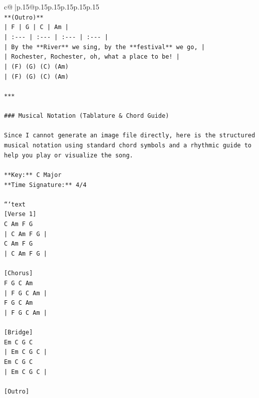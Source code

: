 \documentclass{article}
\begin{document}
{\begin{supertabular}{c@{$\;$}|p{.15\linewidth}@{}p{.15\linewidth}p{.15\linewidth}p{.15\linewidth}p{.15\linewidth}p{.15\linewidth}}
{{{\\ 
\texttt{**(Outro)**} \\
\texttt{| F | G | C | Am |} \\
\texttt{| :{-}{-}{-} | :{-}{-}{-} | :{-}{-}{-} | :{-}{-}{-} |} \\
\texttt{| By the **River** we sing, by the **festival** we go, |} \\
\texttt{| Rochester, Rochester, oh, what a place to be! |} \\
\texttt{| (F) (G) (C) (Am)} \\
\texttt{| (F) (G) (C) (Am)} \\
\\ 
\texttt{***} \\
\\ 
\texttt{\#\#\# Musical Notation (Tablature \& Chord Guide)} \\
\\ 
\texttt{Since I cannot generate an image file directly, here is the structured musical notation using standard chord symbols and a rhythmic guide to help you play or visualize the song.} \\
\\ 
\texttt{**Key:** C Major} \\
\texttt{**Time Signature:** 4/4} \\
\\ 
\texttt{```text} \\
\texttt{{[}Verse 1{]}} \\
\texttt{C  Am  F  G} \\
\texttt{| C  Am  F  G |} \\
\texttt{C  Am  F  G} \\
\texttt{| C  Am  F  G |} \\
\\ 
\texttt{{[}Chorus{]}} \\
\texttt{F  G  C  Am} \\
\texttt{| F  G  C  Am |} \\
\texttt{F  G  C  Am} \\
\texttt{| F  G  C  Am |} \\
\\ 
\texttt{{[}Bridge{]}} \\
\texttt{Em  C  G  C} \\
\texttt{| Em  C  G  C |} \\
\texttt{Em  C  G  C} \\
\texttt{| Em  C  G  C |} \\
\\ 
\texttt{{[}Outro{]}} \\
}}}
\end{supertabular}}
\end{document}
